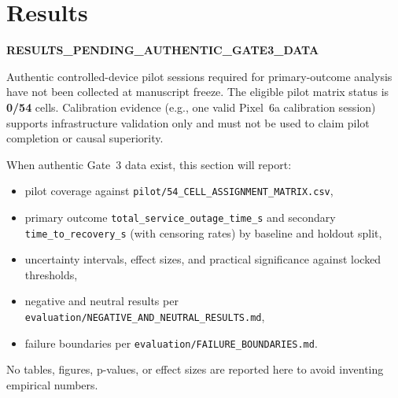 \section{Results}
\label{sec:results}

\textbf{RESULTS\_PENDING\_AUTHENTIC\_GATE3\_DATA}

Authentic controlled-device pilot sessions required for primary-outcome analysis have not been collected at manuscript freeze.
The eligible pilot matrix status is \textbf{0/54} cells.
Calibration evidence (e.g., one valid Pixel~6a calibration session) supports infrastructure validation only and must not be used to claim pilot completion or causal superiority.

When authentic Gate~3 data exist, this section will report:
\begin{itemize}
  \item pilot coverage against \texttt{pilot/54\_CELL\_ASSIGNMENT\_MATRIX.csv},
  \item primary outcome \texttt{total\_service\_outage\_time\_s} and secondary \texttt{time\_to\_recovery\_s} (with censoring rates) by baseline and holdout split,
  \item uncertainty intervals, effect sizes, and practical significance against locked thresholds,
  \item negative and neutral results per \texttt{evaluation/NEGATIVE\_AND\_NEUTRAL\_RESULTS.md},
  \item failure boundaries per \texttt{evaluation/FAILURE\_BOUNDARIES.md}.
\end{itemize}

No tables, figures, p-values, or effect sizes are reported here to avoid inventing empirical numbers.
